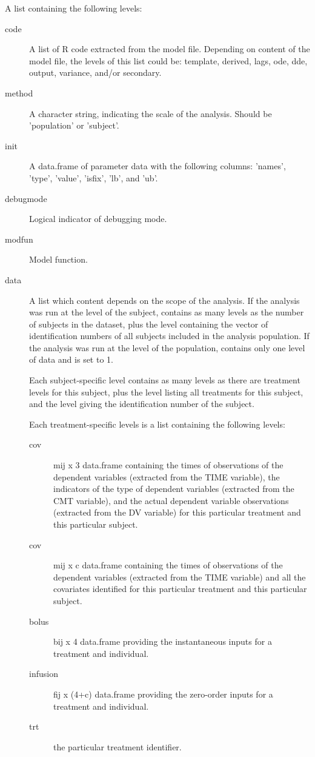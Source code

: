 \begin{Arguments}
\begin{ldescription}
\item[\code{problem}] A list containing the following levels:\begin{description}

\item[code] A list of R code extracted from the model file. Depending on 
content of the model file, the levels of this list could be: template,
derived, lags, ode, dde, output, variance, and/or secondary.
\item[method] A character string, indicating the scale of the analysis. Should
be 'population' or 'subject'.
\item[init] A data.frame of parameter data with the following columns:
'names', 'type', 'value', 'isfix', 'lb', and 'ub'.
\item[debugmode] Logical indicator of debugging mode.
\item[modfun] Model function.
\item[data] A list which content depends on the scope of the analysis. If 
the analysis was run at the level of the subject,  contains as 
many levels as the number of subjects in the dataset, plus the 
level containing the vector of identification numbers of all subjects 
included in the analysis population. If the analysis was run at the level 
of the population,  contains only one level of data and 
 is set to 1.

Each subject-specific level contains as many levels as there are treatment
levels for this subject, plus the  level listing all treatments
for this subject, and the  level giving the identification number
of the subject. 

Each treatment-specific levels is a list containing the following levels: 
\begin{description}

\item[cov] mij x 3 data.frame containing the times of observations of the
dependent variables (extracted from the TIME variable), the indicators
of the type of dependent variables (extracted from the CMT variable),
and the actual dependent variable observations (extracted from the 
DV variable) for this particular treatment and this particular 
subject.
\item[cov] mij x c data.frame containing the times of observations of 
the dependent variables (extracted from the TIME variable) and all the
covariates identified for this particular treatment and this 
particular subject.
\item[bolus] bij x 4 data.frame providing the instantaneous inputs for a
treatment and individual.
\item[infusion] fij x (4+c) data.frame providing the zero-order inputs for
a treatment and individual.
\item[trt] the particular treatment identifier.
\end{description}




\end{description}
\end{ldescription}
\end{Arguments}

